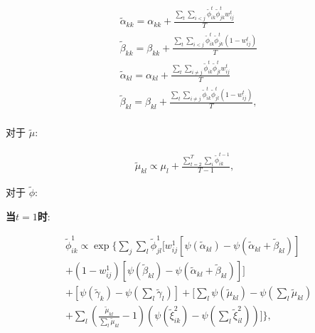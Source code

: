 \begin{equation}
\label{eq6}
\begin{split}
& \widetilde{\alpha}_{kk} = \alpha_{kk} + \frac{\sum_t \sum_{i<j} \widetilde{\phi}_{ik}^t \widetilde{\phi}_{jk}^t w_{ij}^t}{T}  \\
& \widetilde{\beta}_{kk} = \beta_{kk} + \frac{\sum_t \sum_{i<j} \widetilde{\phi}_{ik}^t \widetilde{\phi}_{jk}^t (1-w_{ij}^t)}{T} \\
& \widetilde{\alpha}_{kl} = \alpha_{kl} + \frac{\sum_t \sum_{i \neq j} \widetilde{\phi}_{ik}^t \widetilde{\phi}_{jl}^t w_{ij}^t}{T} \\
& \widetilde{\beta}_{kl} = \beta_{kl} + \frac{\sum_t \sum_{i \neq j} \widetilde{\phi}_{ik}^t \widetilde{\phi}_{jl}^t (1-w_{ij}^t)}{T}  ,\\
\end{split}
\end{equation}

对于\textbf{ $\widetilde{\mu}$}:

\begin{equation}
\label{eq7}
\begin{split}
\widetilde{\mu}_{kl} \propto \mu_l + \frac{\sum_{t=2}^T \sum_i \widetilde{\phi}_{ik}^{t-1}}{T-1} ,
\end{split}
\end{equation}

对于 \textbf{$\widetilde{\phi}$}:

\textbf{当$t=1$时}:

\begin{equation}
\label{eq8}
\begin{split}
&\widetilde{\phi}_{ik}^1 \propto \exp\{\sum_j \sum_l \widetilde{\phi}_{jl}^1 [w_{ij}^1[\psi(\widetilde{\alpha}_{kl})-\psi(\widetilde{\alpha}_{kl}+\widetilde{\beta}_{kl})]\\
 &+ (1-w_{ij}^1)[\psi(\widetilde{\beta}_{kl}) - \psi(\widetilde{\alpha}_{kl}+\widetilde{\beta}_{kl})] ]   \\
& +[\psi(\widetilde{\gamma}_k)-\psi(\sum_l \widetilde{\gamma}_l) ] +[\sum_l \psi(\widetilde{\mu}_{kl}) - \psi(\sum_l \widetilde{\mu}_{kl}) \\
&+ \sum_l (\frac{\widetilde{\mu}_{kl}}{\sum_l \widetilde{\mu}_{kl}}-1)(\psi (\widetilde{\xi}_{ik}^2) - \psi(\sum_l \widetilde{\xi}_{il}^2))]  \} ,\\
\end{split}
\end{equation}

